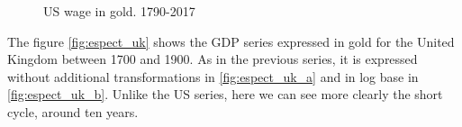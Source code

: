 \documentclass[a4paper,10cpi]{article}
\begin{document}
	
	\begin{figure}[H]
		\centering
		\caption{US wage in gold. 1790-2017} \label{fig:espect_wg}
	\end{figure}
	
	The figure \ref{fig:espect_uk} shows the GDP series expressed in gold for the United Kingdom between 1700 and 1900. As in the previous series, it is expressed without additional transformations in \ref{fig:espect_uk_a} and in log base in \ref{fig:espect_uk_b}. Unlike the US series, here we can see more clearly the short cycle, around ten years.
	
\end{document}
